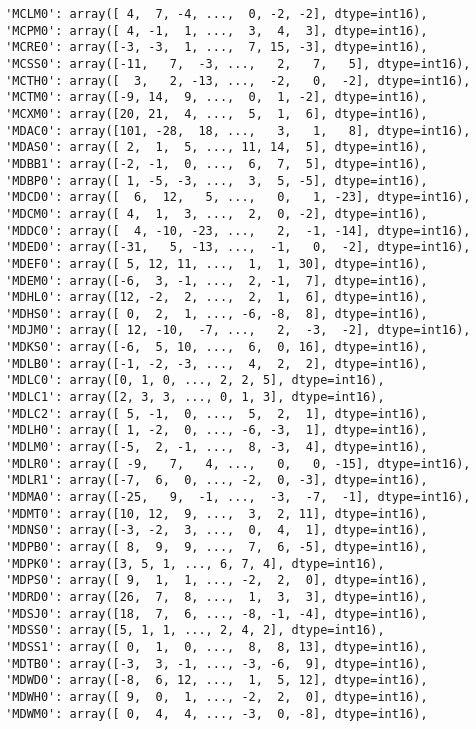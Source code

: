 \documentclass[11pt]{article}
\begin{document}
\begin{verbatim}
 'MCLM0': array([ 4,  7, -4, ...,  0, -2, -2], dtype=int16),
 'MCPM0': array([ 4, -1,  1, ...,  3,  4,  3], dtype=int16),
 'MCRE0': array([-3, -3,  1, ...,  7, 15, -3], dtype=int16),
 'MCSS0': array([-11,   7,  -3, ...,   2,   7,   5], dtype=int16),
 'MCTH0': array([  3,   2, -13, ...,  -2,   0,  -2], dtype=int16),
 'MCTM0': array([-9, 14,  9, ...,  0,  1, -2], dtype=int16),
 'MCXM0': array([20, 21,  4, ...,  5,  1,  6], dtype=int16),
 'MDAC0': array([101, -28,  18, ...,   3,   1,   8], dtype=int16),
 'MDAS0': array([ 2,  1,  5, ..., 11, 14,  5], dtype=int16),
 'MDBB1': array([-2, -1,  0, ...,  6,  7,  5], dtype=int16),
 'MDBP0': array([ 1, -5, -3, ...,  3,  5, -5], dtype=int16),
 'MDCD0': array([  6,  12,   5, ...,   0,   1, -23], dtype=int16),
 'MDCM0': array([ 4,  1,  3, ...,  2,  0, -2], dtype=int16),
 'MDDC0': array([  4, -10, -23, ...,   2,  -1, -14], dtype=int16),
 'MDED0': array([-31,   5, -13, ...,  -1,   0,  -2], dtype=int16),
 'MDEF0': array([ 5, 12, 11, ...,  1,  1, 30], dtype=int16),
 'MDEM0': array([-6,  3, -1, ...,  2, -1,  7], dtype=int16),
 'MDHL0': array([12, -2,  2, ...,  2,  1,  6], dtype=int16),
 'MDHS0': array([ 0,  2,  1, ..., -6, -8,  8], dtype=int16),
 'MDJM0': array([ 12, -10,  -7, ...,   2,  -3,  -2], dtype=int16),
 'MDKS0': array([-6,  5, 10, ...,  6,  0, 16], dtype=int16),
 'MDLB0': array([-1, -2, -3, ...,  4,  2,  2], dtype=int16),
 'MDLC0': array([0, 1, 0, ..., 2, 2, 5], dtype=int16),
 'MDLC1': array([2, 3, 3, ..., 0, 1, 3], dtype=int16),
 'MDLC2': array([ 5, -1,  0, ...,  5,  2,  1], dtype=int16),
 'MDLH0': array([ 1, -2,  0, ..., -6, -3,  1], dtype=int16),
 'MDLM0': array([-5,  2, -1, ...,  8, -3,  4], dtype=int16),
 'MDLR0': array([ -9,   7,   4, ...,   0,   0, -15], dtype=int16),
 'MDLR1': array([-7,  6,  0, ..., -2,  0, -3], dtype=int16),
 'MDMA0': array([-25,   9,  -1, ...,  -3,  -7,  -1], dtype=int16),
 'MDMT0': array([10, 12,  9, ...,  3,  2, 11], dtype=int16),
 'MDNS0': array([-3, -2,  3, ...,  0,  4,  1], dtype=int16),
 'MDPB0': array([ 8,  9,  9, ...,  7,  6, -5], dtype=int16),
 'MDPK0': array([3, 5, 1, ..., 6, 7, 4], dtype=int16),
 'MDPS0': array([ 9,  1,  1, ..., -2,  2,  0], dtype=int16),
 'MDRD0': array([26,  7,  8, ...,  1,  3,  3], dtype=int16),
 'MDSJ0': array([18,  7,  6, ..., -8, -1, -4], dtype=int16),
 'MDSS0': array([5, 1, 1, ..., 2, 4, 2], dtype=int16),
 'MDSS1': array([ 0,  1,  0, ...,  8,  8, 13], dtype=int16),
 'MDTB0': array([-3,  3, -1, ..., -3, -6,  9], dtype=int16),
 'MDWD0': array([-8,  6, 12, ...,  1,  5, 12], dtype=int16),
 'MDWH0': array([ 9,  0,  1, ..., -2,  2,  0], dtype=int16),
 'MDWM0': array([ 0,  4,  4, ..., -3,  0, -8], dtype=int16),

\end{verbatim}
\end{document}
